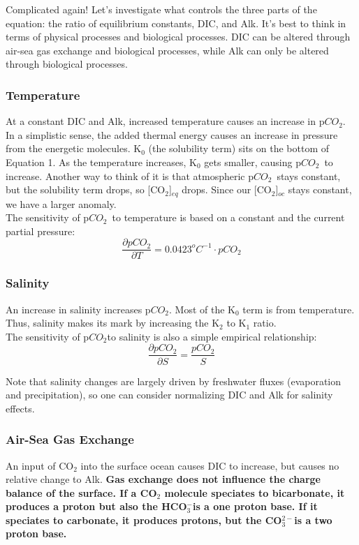 \documentclass[12pt]{article}
\newcommand{\pco}{p$CO_{2}$}
\newcommand{\bicarb}{HCO$_{3}^{-}$}
\newcommand{\carb}{CO$_{3}^{2-}$}
\begin{document}
Complicated again! Let's investigate what controls the three parts of the equation: the ratio of equilibrium constants, DIC, and Alk. It's best to think in terms of physical processes and biological processes. DIC can be altered through air-sea gas exchange and biological processes, while Alk can only be altered through biological processes.

\subsubsection{Temperature}
At a constant DIC and Alk, increased temperature causes an increase in \pco. In a simplistic sense, the added thermal energy causes an increase in pressure from the energetic molecules. K$_{0}$ (the solubility term) sits on the bottom of Equation 1. As the temperature increases, K$_{0}$ gets smaller, causing \pco~to increase. Another way to think of it is that atmospheric \pco~stays constant, but the solubility term drops, so [CO$_{2}$]$_{eq}$ drops. Since our [CO$_{2}$]$_{oc}$ stays constant, we have a larger anomaly. \\

The sensitivity of \pco~to temperature is based on a constant and the current partial pressure:
$$
\frac{\partial pCO_{2}}{\partial T} = 0.0423^{o}C^{-1}\cdot pCO_{2}
$$

\subsubsection{Salinity}
An increase in salinity increases \pco. Most of the K$_{0}$ term is from temperature. Thus, salinity makes its mark by increasing the K$_{2}$ to K$_{1}$ ratio. \\

The sensitivity of \pco to salinity is also a simple empirical relationship:
$$
\frac{\partial pCO_{2}}{\partial S} = \frac{pCO_{2}}{S}
$$

Note that salinity changes are largely driven by freshwater fluxes (evaporation and precipitation), so one can consider normalizing DIC and Alk for salinity effects.

\subsubsection{Air-Sea Gas Exchange}
An input of CO$_{2}$ into the surface ocean causes DIC to increase, but causes no relative change to Alk. \bf Gas exchange does not influence the charge balance of the surface\rm. If a CO$_{2}$ molecule speciates to bicarbonate, it produces a proton but also the \bicarb is a one proton base. If it speciates to carbonate, it produces protons, but the \carb is a two proton base. 
\end{document}

